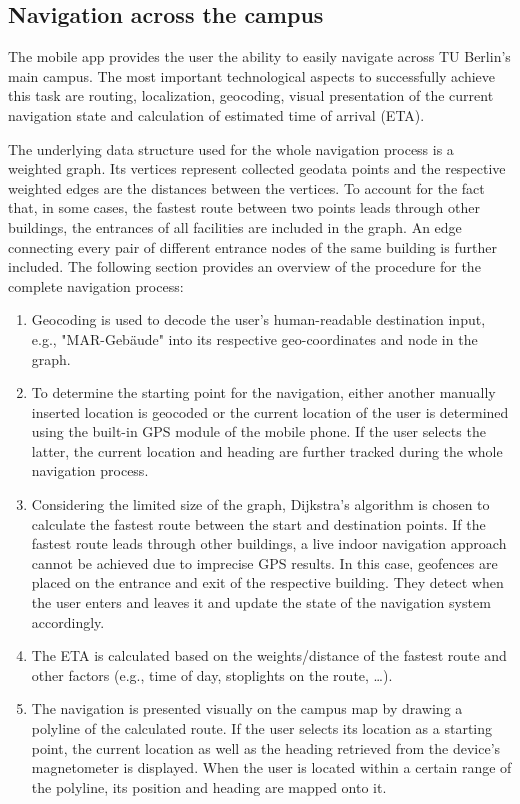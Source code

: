 \subsection{Navigation across the campus}
The mobile app provides the user the ability to easily navigate across TU Berlin's main campus. The most important technological aspects to successfully achieve this task are routing, localization, geocoding, visual presentation of the current navigation state and calculation of estimated time of arrival (ETA).

The underlying data structure used for the whole navigation process is a weighted graph. Its vertices represent collected geodata points and the respective weighted edges are the distances between the vertices. To account for the fact that, in some cases, the fastest route between two points leads through other buildings, the entrances of all facilities are included in the graph. An edge connecting every pair of different entrance nodes of the same building is further included. The following section provides an overview of the procedure for the complete navigation process:

\begin{enumerate}
    \item Geocoding is used to decode the user's human-readable destination input, e.g., "MAR-Gebäude" into its respective geo-coordinates and node in the graph.
    \item To determine the starting point for the navigation, either another manually inserted location is geocoded or the current location of the user is determined using the built-in GPS module of the mobile phone. If the user selects the latter, the current location and heading are further tracked during the whole navigation process.
    \item Considering the limited size of the graph, Dijkstra's algorithm is chosen to calculate the fastest route between the start and destination points. If the fastest route leads through other buildings, a live indoor navigation approach cannot be achieved due to imprecise GPS results. In this case, geofences are placed on the entrance and exit of the respective building. They detect when the user enters and leaves it and update the state of the navigation system accordingly.
    \item The ETA is calculated based on the weights/distance of the fastest route and other factors (e.g., time of day, stoplights on the route, \ldots).
    \item The navigation is presented visually on the campus map by drawing a polyline of the calculated route. If the user selects its location as a starting point, the current location as well as the heading retrieved from the device's magnetometer is displayed. When the user is located within a certain range of the polyline, its position and heading are mapped onto it.
\end{enumerate}

